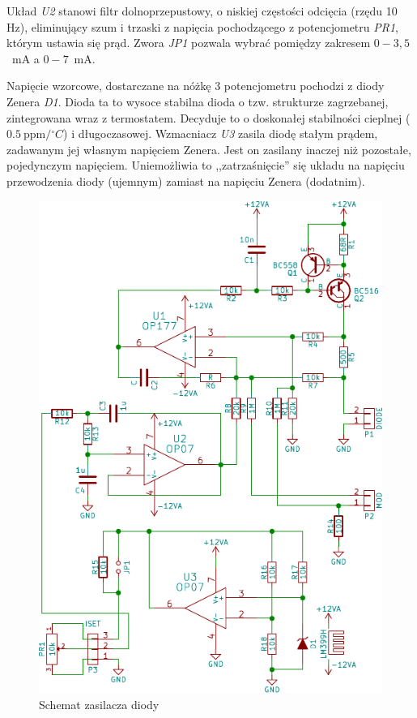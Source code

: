 \documentclass[a4paper,10pt]{article}
\begin{document}
Układ \textit{U2} stanowi filtr dolnoprzepustowy, o niskiej częstości odcięcia (rzędu 10 Hz), eliminujący szum i trzaski z napięcia pochodzącego z potencjometru \textit{PR1}, którym ustawia się prąd. Zwora \textit{JP1} pozwala wybrać pomiędzy zakresem $0-3{,}5$~mA a $0-7$~mA.

Napięcie wzorcowe, dostarczane na nóżkę 3 potencjometru pochodzi z diody Zenera \textit{D1}. Dioda ta to wysoce stabilna dioda o tzw. strukturze zagrzebanej, zintegrowana wraz z termostatem. Decyduje to o doskonałej stabilności cieplnej ($0.5~\mathrm{ppm}/{}^{\circ}C$) i długoczasowej.  Wzmacniacz \textit{U3} zasila diodę stałym prądem, zadawanym jej własnym napięciem Zenera. Jest on zasilany inaczej niż pozostałe, pojedynczym napięciem. Uniemożliwia to ,,zatrzaśnięcie'' się układu na napięciu przewodzenia diody (ujemnym) zamiast na napięciu Zenera (dodatnim). 

\begin{figure}
\begin{center}
 \includegraphics{./obrazki/VcselPSU.pdf}
\end{center}
\caption{Schemat zasilacza diody}
\label{sch-psu}
\end{figure}
\end{document}
